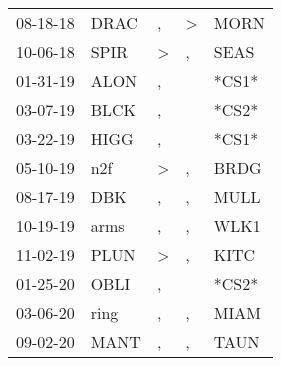 \begin{supertabular}{lllll}
 08-18-18 &   DRAC &                , &     \textgreater &   MORN \\
 10-06-18 &   SPIR &     \textgreater &                , &   SEAS \\
 01-31-19 &   ALON &                , &                  &  *CS1* \\
 03-07-19 &   BLCK &                , &                  &  *CS2* \\
 03-22-19 &   HIGG &                , &                  &  *CS1* \\
 05-10-19 &    n2f &     \textgreater &                , &   BRDG \\
 08-17-19 &    DBK &                , &                , &   MULL \\
 10-19-19 &   arms &                , &                , &   WLK1 \\
 11-02-19 &   PLUN &     \textgreater &                , &   KITC \\
 01-25-20 &   OBLI &                , &                  &  *CS2* \\
 03-06-20 &   ring &                , &                , &   MIAM \\
 09-02-20 &   MANT &                , &                , &   TAUN \\
\end{supertabular}
